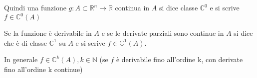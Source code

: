 \documentclass[../appunti-analisi.tex]{subfiles}
\begin{document}
Quindi una funzione $g: A \subset \mathbb{R}^{n} \rightarrow \mathbb{R}$ continua in $A$ si dice classe $\mathbb{C}^{0}$ e si scrive $f \in \mathbb{C}^{0}(A)$


Se la funzione è derivabile in $A$ e se le derivate parziali sono continue in $A$ si dice che è di classe $\mathbb{C}^{1}$ su $A$ e si scrive $f \in \mathbb{C}^{1}(A)$.


In generale $f \in \mathbb{C}^{k}(A), k \in \mathbb{N}$ (se $f$ è derivabile fino all'ordine k, con derivate fino all'ordine k continue)
\end{document}
